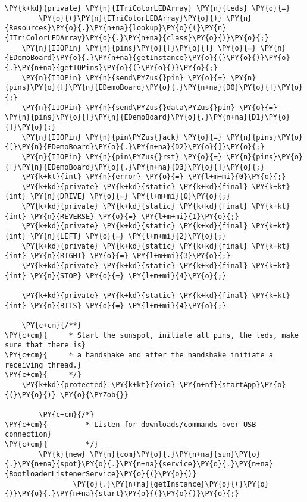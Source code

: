 \begin{Verbatim}[commandchars=\\\{\}]
    \PY{k+kd}{private} \PY{n}{ITriColorLEDArray} \PY{n}{leds} \PY{o}{=}
        \PY{o}{(}\PY{n}{ITriColorLEDArray}\PY{o}{)} \PY{n}{Resources}\PY{o}{.}\PY{n+na}{lookup}\PY{o}{(}\PY{n}{ITriColorLEDArray}\PY{o}{.}\PY{n+na}{class}\PY{o}{)}\PY{o}{;}
    \PY{n}{IIOPin} \PY{n}{pins}\PY{o}{[}\PY{o}{]} \PY{o}{=} \PY{n}{EDemoBoard}\PY{o}{.}\PY{n+na}{getInstance}\PY{o}{(}\PY{o}{)}\PY{o}{.}\PY{n+na}{getIOPins}\PY{o}{(}\PY{o}{)}\PY{o}{;}
    \PY{n}{IIOPin} \PY{n}{send\PYZus{}pin} \PY{o}{=} \PY{n}{pins}\PY{o}{[}\PY{n}{EDemoBoard}\PY{o}{.}\PY{n+na}{D0}\PY{o}{]}\PY{o}{;}
    \PY{n}{IIOPin} \PY{n}{send\PYZus{}data\PYZus{}pin} \PY{o}{=} \PY{n}{pins}\PY{o}{[}\PY{n}{EDemoBoard}\PY{o}{.}\PY{n+na}{D1}\PY{o}{]}\PY{o}{;}
    \PY{n}{IIOPin} \PY{n}{pin\PYZus{}ack} \PY{o}{=} \PY{n}{pins}\PY{o}{[}\PY{n}{EDemoBoard}\PY{o}{.}\PY{n+na}{D2}\PY{o}{]}\PY{o}{;}
    \PY{n}{IIOPin} \PY{n}{pin\PYZus{}rst} \PY{o}{=} \PY{n}{pins}\PY{o}{[}\PY{n}{EDemoBoard}\PY{o}{.}\PY{n+na}{D3}\PY{o}{]}\PY{o}{;}
    \PY{k+kt}{int} \PY{n}{error} \PY{o}{=} \PY{l+m+mi}{0}\PY{o}{;}
    \PY{k+kd}{private} \PY{k+kd}{static} \PY{k+kd}{final} \PY{k+kt}{int} \PY{n}{DRIVE} \PY{o}{=} \PY{l+m+mi}{0}\PY{o}{;}
    \PY{k+kd}{private} \PY{k+kd}{static} \PY{k+kd}{final} \PY{k+kt}{int} \PY{n}{REVERSE} \PY{o}{=} \PY{l+m+mi}{1}\PY{o}{;}
    \PY{k+kd}{private} \PY{k+kd}{static} \PY{k+kd}{final} \PY{k+kt}{int} \PY{n}{LEFT} \PY{o}{=} \PY{l+m+mi}{2}\PY{o}{;}
    \PY{k+kd}{private} \PY{k+kd}{static} \PY{k+kd}{final} \PY{k+kt}{int} \PY{n}{RIGHT} \PY{o}{=} \PY{l+m+mi}{3}\PY{o}{;}
    \PY{k+kd}{private} \PY{k+kd}{static} \PY{k+kd}{final} \PY{k+kt}{int} \PY{n}{STOP} \PY{o}{=} \PY{l+m+mi}{4}\PY{o}{;}

    \PY{k+kd}{private} \PY{k+kd}{static} \PY{k+kd}{final} \PY{k+kt}{int} \PY{n}{BITS} \PY{o}{=} \PY{l+m+mi}{4}\PY{o}{;}

    \PY{c+cm}{/**}
\PY{c+cm}{     * Start the sunspot, initiate all pins, the leds, make sure that there is}
\PY{c+cm}{     * a handshake and after the handshake initiate a receiving thread.}
\PY{c+cm}{     */}
    \PY{k+kd}{protected} \PY{k+kt}{void} \PY{n+nf}{startApp}\PY{o}{(}\PY{o}{)} \PY{o}{\PYZob{}}

        \PY{c+cm}{/*}
\PY{c+cm}{         * Listen for downloads/commands over USB connection}
\PY{c+cm}{         */}
        \PY{k}{new} \PY{n}{com}\PY{o}{.}\PY{n+na}{sun}\PY{o}{.}\PY{n+na}{spot}\PY{o}{.}\PY{n+na}{service}\PY{o}{.}\PY{n+na}{BootloaderListenerService}\PY{o}{(}\PY{o}{)}
                \PY{o}{.}\PY{n+na}{getInstance}\PY{o}{(}\PY{o}{)}\PY{o}{.}\PY{n+na}{start}\PY{o}{(}\PY{o}{)}\PY{o}{;}


\end{Verbatim}
